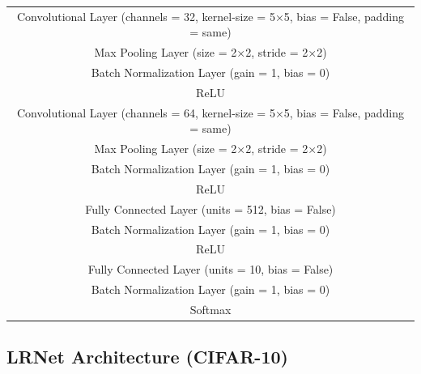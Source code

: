 \begin{table}[H]
\begin{center}
\begin{tabular}{  c  }
\hline
   Convolutional Layer (channels = 32, kernel-size = 5×5, bias = False, padding = same)\\ 
   Max Pooling Layer (size = 2×2, stride = 2×2)   \\
   Batch Normalization Layer (gain = 1, bias = 0) \\ 
   ReLU  \\ \hline

   Convolutional Layer (channels = 64, kernel-size = 5×5, bias = False, padding = same) \\ 
   Max Pooling Layer (size = 2×2, stride = 2×2) \\
   Batch Normalization Layer (gain = 1, bias = 0) \\ 
   ReLU \\ \hline   
   
   Fully Connected Layer (units = 512, bias = False) \\
   Batch Normalization Layer (gain = 1, bias = 0) \\ 
   ReLU \\ \hline
   
   Fully Connected Layer (units = 10, bias = False)  \\
   Batch Normalization Layer (gain = 1, bias = 0) \\ 
   Softmax   \\\hline

\end{tabular}
\end{center}
\end{table}


\subsection*{LRNet Architecture (CIFAR-10)}


